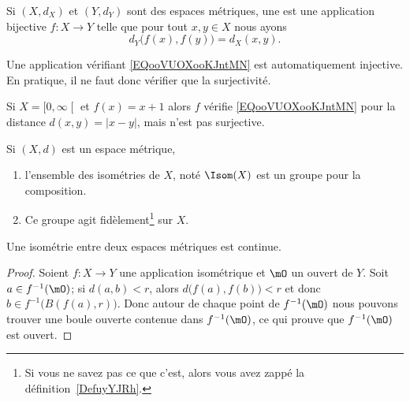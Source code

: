 \begin{definition}
    Si \( (X,d_X)\) et \( (Y,d_Y)\) sont des espaces métriques, une  est une application bijective \( f\colon X\to Y\) telle que pour tout \( x,y\in X\) nous ayons
    \begin{equation}        \label{EQooVUOXooKJntMN}
        d_Y\big( f(x),f(y) \big)=d_X(x,y).
    \end{equation}
\end{definition}

\begin{remark}
    Une application vérifiant \eqref{EQooVUOXooKJntMN} est automatiquement injective. En pratique, il ne faut donc vérifier que la surjectivité.
\end{remark}

\begin{example}
    Si \( X=\mathopen[ 0 , \infty \mathclose[\) et \( f(x)=x+1\) alors \( f\) vérifie \eqref{EQooVUOXooKJntMN} pour la distance \( d(x,y)=| x-y |\), mais n'est pas surjective.
\end{example}

\begin{propositionDef}
    Si \( (X,d)\) est un espace métrique,
    \begin{enumerate}
        \item
            l'ensemble des isométries de \( X\), noté \( \Isom(X)\) est un groupe pour la composition.
        \item
            Ce groupe agit fidèlement\footnote{Si vous ne savez pas ce que c'est, alors vous avez zappé la définition~\ref{DefuyYJRh}.} sur \( X\).
    \end{enumerate}
\end{propositionDef}
\begin{proposition}\label{PropLYMgVMJ}
    Une isométrie entre deux espaces métriques est continue.
\end{proposition}

\begin{proof}
    Soient \( f\colon X\to Y\) une application isométrique et \( \mO\) un ouvert de \( Y\). Soit \( a\in f^{-1}(\mO)\); si \( d(a,b)<r\), alors \( d\big( f(a),f(b) \big)<r\) et donc \( b\in f^{-1}\big( B(f(a),r) \big)\). Donc autour de chaque point de \( f^{-1}(\mO)\) nous pouvons trouver une boule ouverte contenue dans \( f^{-1}(\mO)\), ce qui prouve que \( f^{-1}(\mO)\) est ouvert.
\end{proof}

